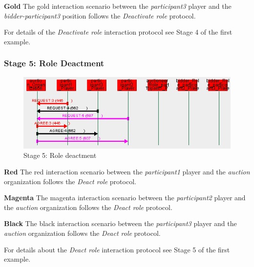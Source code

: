 \textbf{Gold} The gold interaction scenario between the \textit{participant3} player and the \textit{bidder-participant3} position follows the \textit{Deactivate role} protocol.

For details of the \textit{Deactivate role} interaction protocol see Stage 4 of the first example.

\subsubsection*{Stage 5: Role Deactment}

\begin{figure}[H]
	\centering
	\includegraphics[width=\textwidth]{images/example3-stage5.png}
	\caption{Stage 5: Role deactment}
	\label{figure:example3-stage5}
\end{figure}

\textbf{Red} The red interaction scenario between the \textit{participant1} player and the \textit{auction} organization follows the \textit{Deact role} protocol.

\textbf{Magenta} The magenta interaction scenario between the \textit{participant2} player and the \textit{auction} organization follows the \textit{Deact role} protocol.
 
\textbf{Black} The black interaction scenario between the \textit{participant3} player and the \textit{auction} organization follows the \textit{Deact role} protocol.

For details about the \textit{Deact role} interaction protocol see Stage 5 of the first example.